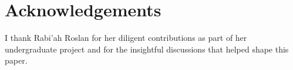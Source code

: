 \documentclass[
  letterpaper,
  DIV=11,
  numbers=noendperiod]{scrartcl}
\begin{document}
\section*{Acknowledgements}\label{acknowledgements}

I thank Rabi'ah Roslan for her diligent contributions as part of her
undergraduate project and for the insightful discussions that helped
shape this paper.
\end{document}
